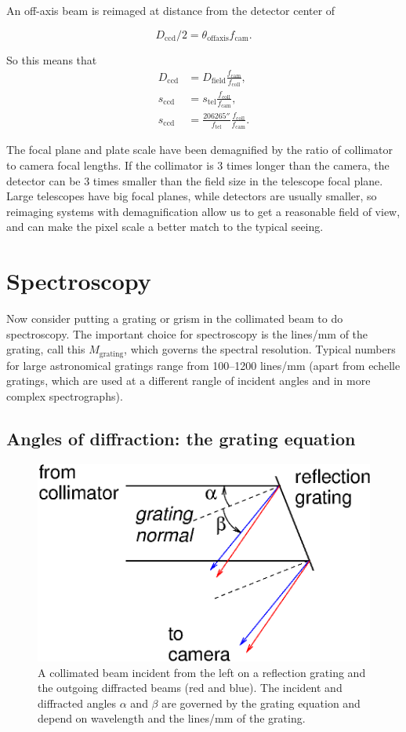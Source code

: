 \documentclass[12pt]{article}
\newcommand{\subscript}[1]{\mathrm{#1}}
\newcommand{\field}{\subscript{field}}
\newcommand{\offaxis}{\subscript{offaxis}}
\newcommand{\tel}{\subscript{tel}}
\newcommand{\coll}{\subscript{coll}}
\newcommand{\ccd}{\subscript{ccd}}
\newcommand{\cam}{\subscript{cam}}
\newcommand{\grating}{\subscript{grating}}
\begin{document}
An off-axis beam is reimaged at distance from the detector center of 

$$ D_{\ccd}/2 = \theta_{\offaxis} f_{\cam}. $$

So this means that
\begin{align*}
D_{\ccd} &= D_{\field} \frac{f_{\cam}}{f_{\coll}}, \\
s_{\ccd} &= s_{\tel} \frac{f_{\coll}}{f_{\cam}}, \\
s_{\ccd} &= \frac{206265''}{f_{\tel}} \frac{f_{\coll}}{f_{\cam}}.
\end{align*}

The focal plane and plate scale have been demagnified by the 
ratio of collimator to camera focal lengths.  If the collimator
is 3 times longer than the camera, the detector can be 3 times smaller
than the field size in the telescope focal plane.
Large telescopes have big focal planes, while detectors are 
usually smaller, so reimaging systems with demagnification 
allow us to get a reasonable field of view, and can
make the pixel scale a better match to the typical seeing.


\section{Spectroscopy}

Now consider putting a grating or grism in the collimated
beam to do spectroscopy.  The important choice for spectroscopy
is the lines/mm of the grating, call this $M_{\grating}$, which 
governs the spectral resolution.  Typical numbers 
for large astronomical gratings range from 100--1200 lines/mm
(apart from echelle gratings, which are used at a different 
rangle of incident angles and in more complex spectrographs).

\subsection{Angles of diffraction: the grating equation}

\begin{figure}[ht]
\centerline{
\includegraphics[width=4.5truein]{grating1.eps}
}
\caption{A collimated beam incident from the left 
on a reflection grating
and the outgoing diffracted beams (red and blue).
The incident and diffracted angles $\alpha$ and $\beta$ are
governed by the grating equation and depend on wavelength
and the lines/mm of the grating.
}
\label{fig-grating}
\end{figure}
\end{document}
